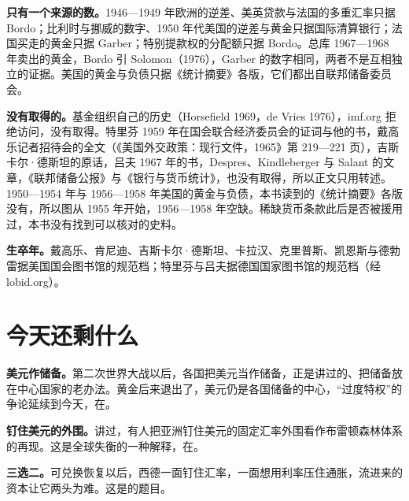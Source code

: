 \begin{deeper}[史料说明]
\textbf{只有一个来源的数。}1946—1949 年欧洲的逆差、美英贷款与法国的多重汇率只据 Bordo；比利时与挪威的数字、1950 年代美国的逆差与黄金只据国际清算银行；法国买走的黄金只据 Garber；特别提款权的分配额只据 Bordo。总库 1967—1968 年卖出的黄金，Bordo 引 Solomon（1976），Garber 的数字相同，两者不是互相独立的证据。美国的黄金与负债只据《统计摘要》各版，它们都出自联邦储备委员会。

\textbf{没有取得的。}基金组织自己的历史（Horsefield 1969，de Vries 1976），imf.org 拒绝访问，没有取得。特里芬 1959 年在国会联合经济委员会的证词与他的书，戴高乐记者招待会的全文（《美国外交政策：现行文件，1965》第 219—221 页），吉斯卡尔·德斯坦的原话，吕夫 1967 年的书，Despres、Kindleberger 与 Salant 的文章，《联邦储备公报》与《银行与货币统计》，也没有取得，所以正文只用转述。1950—1954 年与 1956—1958 年美国的黄金与负债，本书读到的《统计摘要》各版没有，所以图从 1955 年开始，1956—1958 年空缺。稀缺货币条款此后是否被援用过，本书没有找到可以核对的史料。

\textbf{生卒年。}戴高乐、肯尼迪、吉斯卡尔·德斯坦、卡拉汉、克里普斯、凯恩斯与德勃雷据美国国会图书馆的规范档；特里芬与吕夫据德国国家图书馆的规范档（经 lobid.org）。
\end{deeper}

\section{今天还剩什么}\label{sec:brettonwoods-legacy}

\textbf{美元作储备。}第二次世界大战以后，各国把美元当作储备，正是讲过的、把储备放在中心国家的老办法。黄金后来退出了，美元仍是各国储备的中心，“过度特权”的争论延续到今天，在。

\textbf{钉住美元的外围。}讲过，有人把亚洲钉住美元的固定汇率外围看作布雷顿森林体系的再现。这是全球失衡的一种解释，在。

\textbf{三选二。}可兑换恢复以后，西德一面钉住汇率，一面想用利率压住通胀，流进来的资本让它两头为难。这是的题目。

